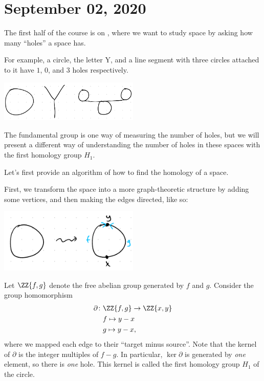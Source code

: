 \documentclass{standalone}
\begin{document}
\chapter{September 02, 2020}
The first half of the course is on , where we want to study
space by asking how many ``holes'' a space has.

For example, a circle, the letter Y, and a line segment with
three circles attached to it have \(1\), \(0\), and \(3\) holes respectively.
\begin{center}
  \includegraphics[width=0.5\textwidth]{18_905-200902-1.png}
\end{center}
The fundamental group is one way of measuring the number of holes, but we will
present a different way of understanding the number of holes in these spaces
with the first homology group \(H_1\).

Let's first provide an algorithm of how to find the homology of a space.
\begin{example}
  First, we transform the space into a more graph-theoretic structure
  by adding some vertices, and then making the edges directed, like so:
  \begin{center}
    \includegraphics[width=0.5\textwidth]{18_905-200902-2.png}
  \end{center}
  Let \(\ZZ\{f, g\}\) denote the free abelian group generated by
  \(f\) and \(g\). Consider the group homomorphism
  \begin{align*}
    \partial \colon &\ZZ\{f, g\} \to \ZZ\{x, y\} \\
      & f \mapsto y - x \\
      & g \mapsto y - x,
  \end{align*}
  where we mapped each edge to their ``target minus source''. Note that
  the kernel of \(\partial\) is the integer multiples of \(f - g\).
  In particular, \(\ker \partial\) is generated by \emph{one} element,
  so there is \emph{one} hole.
  This kernel is called the first homology group \(H_1\) of the circle.
\end{example}
\end{document}
